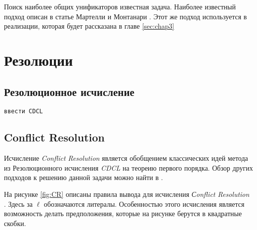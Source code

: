 Поиск наиболее общих унификаторов известная задача. Наиболее известный подход описан в статье Мартелли и Монтанари \cite{Martelli:1982:EUA:357162.357169}. Этот же подход используется в реализации, которая будет рассказана в главе \ref{sec:chap3}

\section{Резолюции}

\subsection{Резолюционное исчисление}
\texttt{ввести CDCL}

\subsection{Conflict Resolution}
\label{sec:CR}
Исчисление \emph{Conflict Resolution} является обобщением классических идей метода из Резолюционного исчисления \emph{CDCL} на теореию первого порядка. Обзор других подходов к решению данной задачи можно найти в \cite{DBLP:journals/corr/SlaneyP16}. 

На рисунке \ref{fig:CR} описаны правила вывода для исчисления \emph{Сonflict Resolution} \cite{DBLP:journals/corr/SlaneyP16}. Здесь за $\ell$ обозначаются литералы. Особенностью этого исчисления является возможность делать предположения, которые на рисунке берутся в квадратные скобки.


